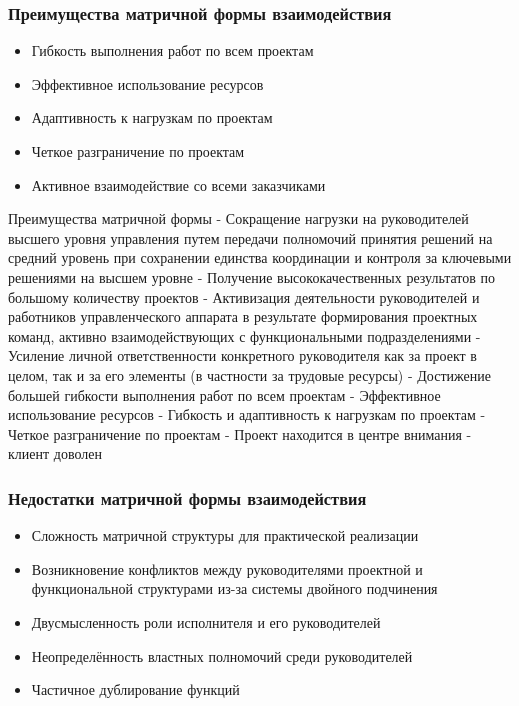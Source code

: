 \documentclass{../industrial-development}
\begin{document}
\begin{frame} \frametitle{Преимущества матричной формы взаимодействия}
  
  \begin{itemize}
 \item Гибкость выполнения работ по всем проектам
 \item Эффективное использование ресурсов
 \item Адаптивность к нагрузкам по проектам
 \item Четкое разграничение по проектам
 \item Активное взаимодействие со всеми заказчиками
  \end{itemize}
\end{frame}

\lecturenotes
Преимущества матричной формы
- Сокращение нагрузки на руководителей высшего уровня управления путем передачи полномочий принятия решений на средний уровень при сохранении единства координации и контроля за ключевыми решениями на высшем уровне
- Получение высококачественных результатов по большому количеству проектов
- Активизация деятельности руководителей и работников управленческого аппарата в результате формирования проектных команд, активно взаимодействующих с функциональными подразделениями
- Усиление личной ответственности конкретного руководителя как за проект в целом, так и за его элементы (в частности за трудовые ресурсы)
- Достижение большей гибкости выполнения работ по всем проектам
- Эффективное использование ресурсов
- Гибкость и адаптивность к нагрузкам по проектам
- Четкое разграничение по проектам
- Проект находится в центре внимания - клиент доволен

\begin{frame} \frametitle{Недостатки матричной формы взаимодействия}
  
  \begin{itemize}
  \item Сложность матричной структуры для практической реализации
  \item Возникновение конфликтов между руководителями проектной и функциональной структурами из-за системы двойного подчинения
  \item Двусмысленность роли исполнителя и его руководителей
  \item Неопределённость властных полномочий среди руководителей
  \item Частичное дублирование функций
\end{itemize}
\end{frame}
\end{document}
